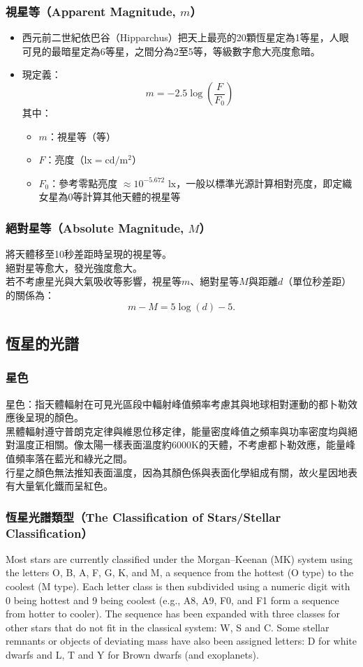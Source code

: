 \documentclass[a4paper,12pt]{report}
\begin{document}
\subsubsection{視星等（Apparent Magnitude, $m$）}
\begin{itemize}
    \item 西元前二世紀依巴谷（Hipparchus）把天上最亮的20顆恆星定為1等星，人眼可見的最暗星定為6等星，之間分為2至5等，等級數字愈大亮度愈暗。
    \item 現定義：
    \[
    m = -2.5 \log \left( \frac{F}{F_0} \right)
    \]
    其中：
    \begin{itemize}
        \item $m$：視星等（等）
        \item $F$：亮度（$\text{lx} = \text{cd}/\text{m}^2$）
        \item $F_0$：參考零點亮度 $\approx 10^{-5.672} \text{ lx}$，一般以標準光源計算相對亮度，即定織女星為0等計算其他天體的視星等
    \end{itemize}
\end{itemize}
\subsubsection{絕對星等（Absolute Magnitude, $M$）}
將天體移至10秒差距時呈現的視星等。\\
絕對星等愈大，發光強度愈大。\\
若不考慮星光與大氣吸收等影響，視星等$m$、絕對星等$M$與距離$d$（單位秒差距）的關係為：
\[m-M=5\log(d)-5.\]
\subsection{恆星的光譜}
\subsubsection{星色}
\bctf{}\efct
星色：指天體輻射在可見光區段中輻射峰值頻率考慮其與地球相對運動的都卜勒效應後呈現的顏色。\\
黑體輻射遵守普朗克定律與維恩位移定律，能量密度峰值之頻率與功率密度均與絕對溫度正相關。像太陽一樣表面溫度約6000K的天體，不考慮都卜勒效應，能量峰值頻率落在藍光和綠光之間。\\
行星之顏色無法推知表面溫度，因為其顏色係與表面化學組成有關，故火星因地表有大量氧化鐵而呈紅色。
\subsubsection{恆星光譜類型（The Classification of Stars/Stellar Classification）}
\bctf{}\efct
Most stars are currently classified under the Morgan–Keenan (MK) system using the letters O, B, A, F, G, K, and M, a sequence from the hottest (O type) to the coolest (M type). Each letter class is then subdivided using a numeric digit with 0 being hottest and 9 being coolest (e.g., A8, A9, F0, and F1 form a sequence from hotter to cooler). The sequence has been expanded with three classes for other stars that do not fit in the classical system: W, S and C. Some stellar remnants or objects of deviating mass have also been assigned letters: D for white dwarfs and L, T and Y for Brown dwarfs (and exoplanets).
\end{document}
